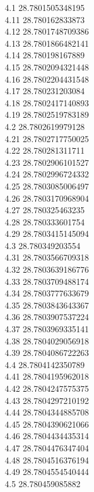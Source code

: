 {4.1	28.7801505348195\\
4.11	28.780162833873\\
4.12	28.7801748709386\\
4.13	28.7801866482141\\
4.14	28.780198167889\\
4.15	28.7802094321448\\
4.16	28.7802204431548\\
4.17	28.780231203084\\
4.18	28.7802417140893\\
4.19	28.7802519783189\\
4.2	28.7802619979128\\
4.21	28.7802717750025\\
4.22	28.780281311711\\
4.23	28.7802906101527\\
4.24	28.7802996724332\\
4.25	28.7803085006497\\
4.26	28.7803170968904\\
4.27	28.780325463235\\
4.28	28.780333601754\\
4.29	28.7803415145094\\
4.3	28.780349203554\\
4.31	28.7803566709318\\
4.32	28.7803639186776\\
4.33	28.7803709488174\\
4.34	28.7803777633679\\
4.35	28.7803843643367\\
4.36	28.7803907537224\\
4.37	28.7803969335141\\
4.38	28.7804029056918\\
4.39	28.7804086722263\\
4.4	28.7804142350789\\
4.41	28.7804195962018\\
4.42	28.7804247575375\\
4.43	28.7804297210192\\
4.44	28.7804344885708\\
4.45	28.7804390621066\\
4.46	28.7804434435314\\
4.47	28.7804476347404\\
4.48	28.7804516376194\\
4.49	28.7804554540444\\
4.5	28.780459085882\\
}
